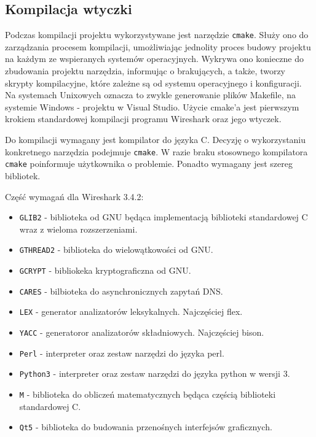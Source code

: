 \documentclass[a4paper, 12pt, twoside, openright]{article}
\begin{document}
	\subsection{Kompilacja wtyczki}
	\indent\par
	Podczas kompilacji projektu wykorzystywane jest narzędzie \texttt{cmake}. Służy ono do zarządzania procesem kompilacji,
	umożliwiając jednolity proces budowy projektu
	na każdym ze wspieranych systemów operacyjnych. Wykrywa ono konieczne do zbudowania projektu narzędzia, informując
	o brakujących, a także, tworzy skrypty kompilacyjne, które zależne są od systemu operacyjnego i konfiguracji. Na systemach Unixowych
	oznacza to zwykle generowanie plików Makefile, na systemie Windows - projektu w Visual Studio. Użycie cmake'a
	jest pierwszym krokiem standardowej kompilacji programu Wireshark oraz jego wtyczek.
	
	Do kompilacji wymagany jest kompilator do języka C. Decyzję o wykorzystaniu konkretnego narzędzia podejmuje \texttt{cmake}.
	W razie braku stosownego kompilatora \texttt{cmake} poinformuje użytkownika o problemie. Ponadto wymagany jest szereg
	bibliotek.

	Część wymagań dla Wireshark 3.4.2:
	\begin{itemize}
		\item \texttt{GLIB2} - biblioteka od GNU będąca implementacją biblioteki standardowej C wraz z wieloma rozszerzeniami.
		\item \texttt{GTHREAD2} - biblioteka do wielowątkowości od GNU.
		\item \texttt{GCRYPT} - bibliokeka kryptograficzna od GNU.
		\item \texttt{CARES} - bilbioteka do asynchronicznych zapytań DNS.
		\item \texttt{LEX} - generator analizatorów leksykalnych. Najczęściej flex.
		\item \texttt{YACC} - generatoror analizatorów składniowych. Najczęściej bison.
		\item \texttt{Perl} - interpreter oraz zestaw narzędzi do języka perl.
		\item \texttt{Python3} - interpreter oraz zestaw narzędzi do języka python w wersji 3.
		\item \texttt{M} - biblioteka do obliczeń matematycznych będąca częścią biblioteki standardowej C.
		\item \texttt{Qt5} - biblioteka do budowania przenośnych interfejsów graficznych.
	\end{itemize}
\end{document}
